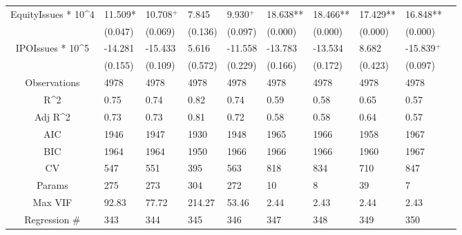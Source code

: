 \documentclass{article}
\begin{document}
\begin{table}[H]
\begin{tabular}{|clllllllll|}
  EquityIssues * 10^4 & 11.509* & 10.708$^{+}$ & 7.845 & 9.930$^{+}$ & 18.638** & 18.466** & 17.429** & 16.848** & \\ 
   & (0.047) & (0.069) & (0.136) & (0.097) & (0.000) & (0.000) & (0.000) & (0.000) & \\ 
  IPOIssues * 10^5 & -14.281 & -15.433 & 5.616 & -11.558 & -13.783 & -13.534 & 8.682 & -15.839$^{+}$ & \\ 
   & (0.155) & (0.109) & (0.572) & (0.229) & (0.166) & (0.172) & (0.423) & (0.097) & \\ 
  \hline 
 Observations & 4978 & 4978 & 4978 & 4978 & 4978 & 4978 & 4978 & 4978 & \\ 
  R^2 & 0.75 & 0.74 & 0.82 & 0.74 & 0.59 & 0.58 & 0.65 & 0.57 & \\ 
  Adj R^2 & 0.73 & 0.73 & 0.81 & 0.72 & 0.58 & 0.58 & 0.64 & 0.57 & \\ 
  AIC & 1946 & 1947 & 1930 & 1948 & 1965 & 1966 & 1958 & 1967 & \\ 
  BIC & 1964 & 1964 & 1950 & 1966 & 1966 & 1966 & 1960 & 1967 & \\ 
  CV & 547 & 551 & 395 & 563 & 818 & 834 & 710 & 847 & \\ 
  Params & 275 & 273 & 304 & 272 & 10 & 8 & 39 & 7 & \\ 
  Max VIF & 92.83 & 77.72 & 214.27 & 53.46 & 2.44 & 2.43 & 2.44 & 2.43 & \\ 
  Regression \# & 343 & 344 & 345 & 346 & 347 & 348 & 349 & 350 & \\ 
   \hline
\end{tabular}
 
\end{table}
\end{document}
